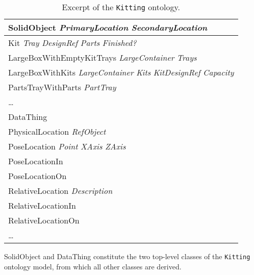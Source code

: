 \begin{table}[h!t!b!]
\caption{Excerpt of the \texttt{Kitting} ontology.}
\label{tab:kittingonto}
\centering
\begin{tabular}{l}
\hline
\textsf{SolidObject} \textit{PrimaryLocation} \textit{SecondaryLocation}
\\\hline
\hspace{5 mm}\textsf{Kit} \textit{Tray} \textit{DesignRef} \textit{Parts} \textit{Finished?}
\\\hline
\hspace{5 mm}\textsf{LargeBoxWithEmptyKitTrays} \textit{LargeContainer} \textit{Trays}
\\\hline
\hspace{5 mm}\textsf{LargeBoxWithKits} \textit{LargeContainer} \textit{Kits} \textit{KitDesignRef} \textit{Capacity}
\\\hline
\hspace{5 mm}\textsf{PartsTrayWithParts} \textit{PartTray}
\\\hline
\hspace{5 mm}\ldots
\\\hline
\textsf{DataThing}
\\\hline
\hspace{5 mm}\textsf{PhysicalLocation} \textit{RefObject}
\\\hline
\hspace{10 mm}\textsf{PoseLocation} \textit{Point} \textit{XAxis} \textit{ZAxis}
\\\hline
\hspace{15 mm}\textsf{PoseLocationIn}
\\\hline
\hspace{15 mm}\textsf{PoseLocationOn}
\\\hline
\hspace{10 mm}\textsf{RelativeLocation} \textit{Description}
\\\hline
\hspace{15 mm}\textsf{RelativeLocationIn}
\\\hline
\hspace{15 mm}\textsf{RelativeLocationOn}
\\\hline
\hspace{5 mm}\ldots
\\\hline
\end{tabular}
\end{table}
\textsf{SolidObject} and \textsf{DataThing} constitute the two top-level classes of the \texttt{Kitting} ontology model, from which all other classes are derived.


